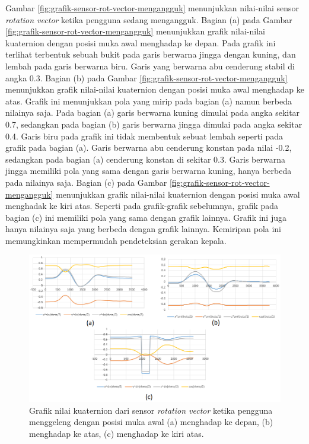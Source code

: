 Gambar \ref{fig:grafik-sensor-rot-vector-mengangguk} menunjukkan nilai-nilai sensor \textit{rotation vector} ketika pengguna sedang mengangguk. Bagian (a) pada Gambar \ref{fig:grafik-sensor-rot-vector-mengangguk} menunjukkan grafik nilai-nilai kuaternion dengan posisi muka awal menghadap ke depan. Pada grafik ini terlihat terbentuk sebuah bukit pada garis berwarna jingga dengan kuning, dan lembah pada garis berwarna biru. Garis yang berwarna abu cenderung stabil di angka 0.3. Bagian (b) pada Gambar \ref{fig:grafik-sensor-rot-vector-mengangguk} menunjukkan grafik nilai-nilai kuaternion dengan posisi muka awal menghadap ke atas. Grafik ini menunjukkan pola yang mirip pada bagian (a) namun berbeda nilainya saja. Pada bagian (a) garis berwarna kuning dimulai pada angka sekitar 0.7, sedangkan pada bagian (b) garis berwarna jingga dimulai pada angka sekitar 0.4. Garis biru pada grafik ini tidak membentuk sebuat lembah seperti  pada grafik pada bagian (a). Garis berwarna abu cenderung konstan pada nilai -0.2, sedangkan pada bagian (a) cenderung konstan di sekitar 0.3. Garis berwarna jingga memiliki pola yang sama dengan garis berwarna kuning, hanya berbeda pada nilainya saja. Bagian (c) pada Gambar \ref{fig:grafik-sensor-rot-vector-mengangguk} menunjukkan grafik nilai-nilai kuaternion dengan posisi muka awal menghadak ke kiri atas. Seperti pada grafik-grafik sebelumnya, grafik pada bagian (c) ini memiliki pola yang sama dengan grafik lainnya. Grafik ini juga hanya nilainya saja yang berbeda dengan grafik lainnya. Kemiripan pola ini memungkinkan mempermudah pendeteksian gerakan kepala. 

\begin{figure}[htbp]
\centering
\includegraphics[scale=0.7]{Gambar/grafik-sensor-rot-vector-menggeleng.png}
\caption{Grafik nilai kuaternion dari sensor \textit{rotation vector} ketika pengguna menggeleng dengan posisi muka awal (a) menghadap ke depan, (b) menghadap ke atas, (c) menghadap ke kiri atas.} 
\label{fig:grafik-sensor-rot-vector-menggeleng}
\end{figure}

